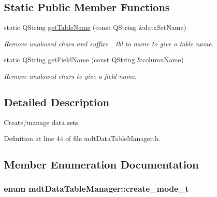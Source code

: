 \subsection*{Static Public Member Functions}
\begin{DoxyCompactItemize}
\item 
\hypertarget{classmdt_data_table_manager_aba53817fb6bd1df5850f53424708ffba}{
static QString \hyperlink{classmdt_data_table_manager_aba53817fb6bd1df5850f53424708ffba}{getTableName} (const QString \&dataSetName)}
\label{classmdt_data_table_manager_aba53817fb6bd1df5850f53424708ffba}

\begin{DoxyCompactList}\small\item\em Remove unalowed chars and suffixe \_\-tbl to name to give a table name. \end{DoxyCompactList}\item 
\hypertarget{classmdt_data_table_manager_a1536b620cfabb8b76e0f5b840cd30bd3}{
static QString \hyperlink{classmdt_data_table_manager_a1536b620cfabb8b76e0f5b840cd30bd3}{getFieldName} (const QString \&columnName)}
\label{classmdt_data_table_manager_a1536b620cfabb8b76e0f5b840cd30bd3}

\begin{DoxyCompactList}\small\item\em Remove unalowed chars to give a field name. \end{DoxyCompactList}\end{DoxyCompactItemize}


\subsection{Detailed Description}
Create/manage data sets. 

Definition at line 44 of file mdtDataTableManager.h.



\subsection{Member Enumeration Documentation}
\hypertarget{classmdt_data_table_manager_a2bccf081737f3237ecdbe346dba559a8}{
\subsubsection[{create\_\-mode\_\-t}]{\setlength{\rightskip}{0pt plus 5cm}enum {\bf mdtDataTableManager::create\_\-mode\_\-t}}}
\label{classmdt_data_table_manager_a2bccf081737f3237ecdbe346dba559a8}


